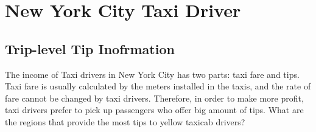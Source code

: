 \documentclass[12pt,twoside]{reedthesis}
\theoremstyle{definition}
\theoremstyle{definition}
\theoremstyle{definition}
\theoremstyle{remark}
\begin{document}
\section{New York City Taxi Driver}\label{new-york-city-taxi-driver}

\subsection{Trip-level Tip
Inofrmation}\label{trip-level-tip-inofrmation}

The income of Taxi drivers in New York City has two parts: taxi fare and
tips. Taxi fare is usually calculated by the meters installed in the
taxis, and the rate of fare cannot be changed by taxi drivers.
Therefore, in order to make more profit, taxi drivers prefer to pick up
passengers who offer big amount of tips. What are the regions that
provide the most tips to yellow taxicab drivers?
\end{document}
